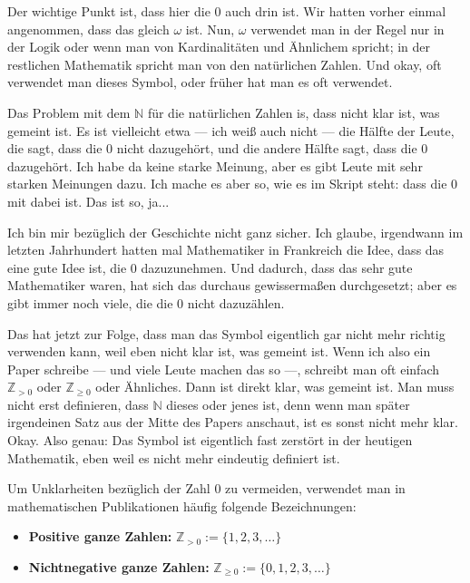 \begin{spoken-clean}[00:01:49 - 00:03:53]
Der wichtige Punkt ist, dass hier die $0$ auch drin ist. Wir hatten vorher einmal angenommen, dass das gleich $\omega$ ist. Nun, $\omega$ verwendet man in der Regel nur in der Logik oder wenn man von Kardinalitäten und Ähnlichem spricht; in der restlichen Mathematik spricht man von den natürlichen Zahlen. Und okay, oft verwendet man dieses Symbol, oder früher hat man es oft verwendet.

Das Problem mit dem $\mathbb{N}$ für die natürlichen Zahlen is, dass nicht klar ist, was gemeint ist. Es ist vielleicht etwa --- ich weiß auch nicht --- die Hälfte der Leute, die sagt, dass die $0$ nicht dazugehört, und die andere Hälfte sagt, dass die $0$ dazugehört. Ich habe da keine starke Meinung, aber es gibt Leute mit sehr starken Meinungen dazu. Ich mache es aber so, wie es im Skript steht: dass die $0$ mit dabei ist. Das ist so, ja...

Ich bin mir bezüglich der Geschichte nicht ganz sicher. Ich glaube, irgendwann im letzten Jahrhundert hatten mal Mathematiker in Frankreich die Idee, dass das eine gute Idee ist, die $0$ dazuzunehmen. Und dadurch, dass das sehr gute Mathematiker waren, hat sich das durchaus gewissermaßen durchgesetzt; aber es gibt immer noch viele, die die $0$ nicht dazuzählen.

Das hat jetzt zur Folge, dass man das Symbol eigentlich gar nicht mehr richtig verwenden kann, weil eben nicht klar ist, was gemeint ist. Wenn ich also ein Paper schreibe --- und viele Leute machen das so ---, schreibt man oft einfach $\mathbb{Z}_{>0}$ oder $\mathbb{Z}_{\ge 0}$ oder Ähnliches. Dann ist direkt klar, was gemeint ist. Man muss nicht erst definieren, dass $\mathbb{N}$ dieses oder jenes ist, denn wenn man später irgendeinen Satz aus der Mitte des Papers anschaut, ist es sonst nicht mehr klar. Okay. Also genau: Das Symbol ist eigentlich fast zerstört in der heutigen Mathematik, eben weil es nicht mehr eindeutig definiert ist.
\end{spoken-clean}

\begin{math-stroke}
Um Unklarheiten bezüglich der Zahl $0$ zu vermeiden, verwendet man in mathematischen Publikationen häufig folgende Bezeichnungen:
\begin{itemize}
    \item \textbf{Positive ganze Zahlen:} $\mathbb{Z}_{>0} := \{1, 2, 3, \dots\}$
    \item \textbf{Nichtnegative ganze Zahlen:} $\mathbb{Z}_{\ge 0} := \{0, 1, 2, 3, \dots\}$
\end{itemize}
\end{math-stroke}

